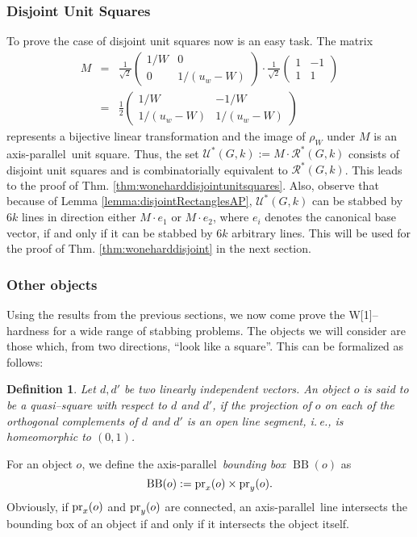 \documentclass[12pt]{article}
\newtheorem{definition}{Definition}
\newcommand{\cclass}[1]{{#1}}
\newcommand{\wone}{\cclass{W[1]}}
\newcommand{\ap}{a.p.\ }
\renewcommand{\ap}{axis-parallel\ }
\newcommand{\calR}{\mathcal{R}}
\newcommand{\calU}{\mathcal{U}}
\newcommand{\BB}{\operatorname{BB}}
\begin{document}
\subsubsection{Disjoint Unit Squares}
To prove the case of disjoint unit squares now is an easy task. The matrix 
\begin{eqnarray*}
M & = & \frac{1}{\sqrt 2}
\left(
\begin{array}{cc}
1/W & 0\\
0 & 1/\left(u_w - W\right)
\end{array} 
\right)
\cdot\frac{1}{\sqrt 2}
\left(
\begin{array}{cr}
1 & -1\\
1 & 1
\end{array}
\right)\\
& = & \frac{1}{2}
\left(
\begin{array}{cc}
1/W & -1/W\\
1/(u_w - W) & 1/(u_w - W)
\end{array} 
\right)
\end{eqnarray*}
represents a bijective linear transformation and the image of $\rho_W$ under $M$ is an \ap unit square. Thus, the set $\calU^*(G, k) := M\cdot \calR^*(G, k)$ consists of disjoint unit squares and is combinatorially equivalent to $\calR^*(G, k)$. This leads to the proof of Thm. \ref{thm:woneharddisjointunitsquares}. Also, observe that because of Lemma \ref{lemma:disjointRectanglesAP}, $\calU^*(G, k)$ can be stabbed by $6k$ lines in direction either $M\cdot e_1$ or $M \cdot e_2$, where $e_i$ denotes the canonical base vector, if and only if it can be stabbed by $6k$ arbitrary lines. This will be used for the proof of Thm. \ref{thm:woneharddisjoint} in the next section. 
\subsubsection{Other objects}

Using the results from the previous sections, we now come prove the \wone--hardness for a wide range of stabbing problems. The objects we will consider are those which, from two directions, ``look like a square''. This can be formalized as follows:
\begin{definition} Let $d, d'$ be two linearly independent vectors. An object $o$ is said to be a \textit{quasi--square} with respect to $d$ and $d'$, if the projection of $o$ on each of the orthogonal complements of $d$ and $d'$ is an open line segment, i.\,e., is homeomorphic to $(0, 1)$.
\end{definition}
For an object $o$, we define the \ap \emph{bounding box $\BB(o)$} as
\[ \BB(o) := \pr_{x}(o) \times \pr_{y}(o). \]
Obviously, if $\operatorname{pr}_x(o)$ and $\operatorname{pr}_y(o)$ are connected, an \ap line intersects the bounding box of an object if and only if it intersects the object itself. 
\end{document}
